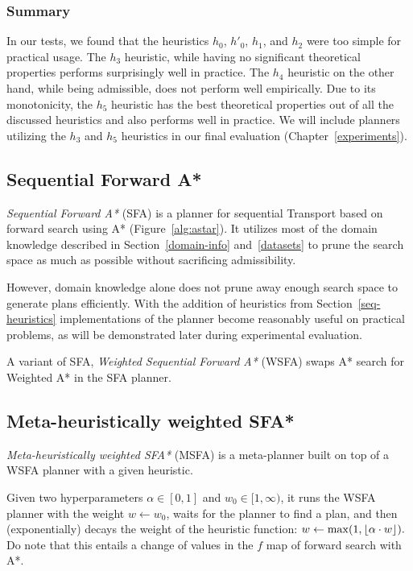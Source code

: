\subsubsection{Summary}

In our tests, we found that
the heuristics $h_0$, $h'_0$, $h_1$, and $h_2$
were too simple for practical usage.
The $h_3$ heuristic, while having no significant
theoretical properties performs surprisingly well in practice.
The $h_4$ heuristic on the other hand, while being admissible, does not
perform well empirically.
Due to its monotonicity, the $h_5$ heuristic has the best theoretical properties out of all the discussed heuristics and also
performs well in practice.
We will include planners utilizing the $h_3$ and $h_5$ heuristics
in our final evaluation (Chapter~\ref{experiments}).








\subsection{Sequential Forward A*}\label{sfa}

\textit{Sequential Forward A*} (SFA) is a planner for sequential Transport based on forward search using A* (Figure~\ref{alg:astar}).
It utilizes most of the domain knowledge described
in Section~\ref{domain-info} and~\ref{datasets}
to prune the search space as much as possible
without sacrificing admissibility.

However, domain knowledge alone does not
prune away enough search space to
generate plans efficiently.
With the addition of 
heuristics
from Section~\ref{seq-heuristics}
implementations of the planner become reasonably useful
on practical problems, as will be demonstrated
later during experimental evaluation.

A variant of SFA, 
\textit{Weighted Sequential Forward A*} (WSFA)
swaps A* search for Weighted A* in the SFA planner.

\subsection{Meta-heuristically weighted SFA*}\label{msfa}

\textit{Meta-heuristically weighted SFA*} (MSFA) is
a meta-planner built on top of a WSFA planner with
a given heuristic.

Given two hyperparameters $\alpha \in [0, 1]$ and $w_0 \in [1, \infty)$,
it runs the WSFA planner with the weight $w \gets w_0$,
waits for the planner to find a plan,
and then (exponentially) decays the 
weight of the heuristic function: $w \gets \max(1, \floor*{\alpha \cdot w}).$
Do note that this entails a change of values in the $f$ map
of forward search with A*.

